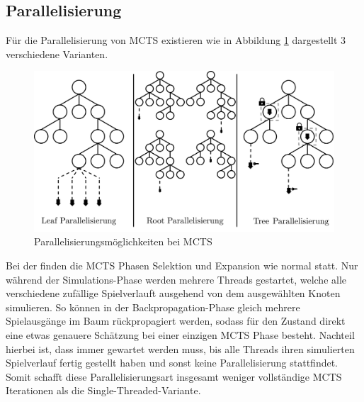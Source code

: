 \subsection{Parallelisierung}

Für die Parallelisierung von \ac{MCTS} existieren wie in Abbildung \ref{fig:mcts-parallization} dargestellt 3 verschiedene Varianten.

\vspace*{-0.3cm}
\begin{figure}[!ht]
    \centering
    \includegraphics[width=\textwidth]{res/pictures/mcts-parallization.pdf}
    \vspace*{-0.75cm}
    \caption[Parallelisierungsmöglichkeiten bei MCTS]{Parallelisierungsmöglichkeiten bei \acs{MCTS}}
    \label{fig:mcts-parallization}
\end{figure}
\vspace*{-0.15cm}

Bei der  finden die \ac{MCTS} Phasen Selektion und Expansion wie normal statt. Nur während der Simulations-Phase werden mehrere Threads gestartet, welche alle verschiedene zufällige Spielverlauft ausgehend von dem ausgewählten Knoten simulieren. So können in der Backpropagation-Phase gleich mehrere Spielausgänge im Baum rückpropagiert werden, sodass für den Zustand direkt eine etwas genauere Schätzung bei einer einzigen \ac{MCTS} Phase besteht. Nachteil hierbei ist, dass immer gewartet werden muss, bis alle Threads ihren simulierten Spielverlauf fertig gestellt haben und sonst keine Parallelisierung stattfindet. Somit schafft diese Parallelisierungsart insgesamt weniger vollständige \ac{MCTS} Iterationen als die Single-Threaded-Variante. \cite[S. 204]{2016.HybridMCTS}

\vspace*{-5cm}

